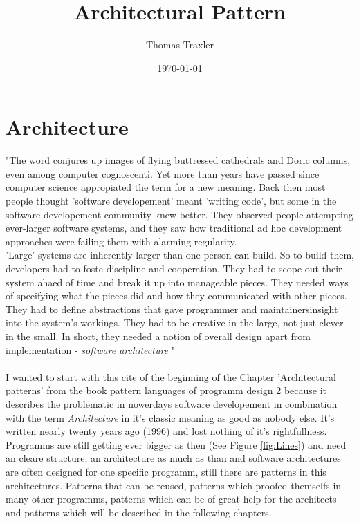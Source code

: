 \documentclass[a4paper,12pt]{scrreprt}
\begin{document}
\author{Thomas Traxler} %
\title{ Architectural Pattern } %
\date{\today} %

\maketitle
\tableofcontents


\chapter{Architecture}
{"}The word conjures up images of flying buttressed cathedrals and Doric columns, even among computer cognoscenti. Yet more than years have passed since computer science appropiated the term for a new meaning. Back then most people thought 'software developement' meant 'writing code', but some in the software developement community knew better. They observed people attempting ever-larger software systems, and they saw how traditional ad hoc development approaches were failing them with alarming regularity. \\ 'Large' systems are inherently larger than one person can build. So to build them, developers had to foste discipline and cooperation. They had to scope out their system ahaed of time and break it up into manageable pieces. They needed ways of specifying what the pieces did and how they communicated with other pieces. They had to define abstractions that gave programmer and maintainersinsight into the system's workings. They had to be creative in the large, not just clever in the small. In short, they needed a notion of overall design apart from implementation - \textit{software architecture} {"}\cite{Lavender1996}\\\\
I wanted to start with this cite of the beginning of the Chapter 'Architectural patterns' from the book pattern languages of programm design 2 because it describes the problematic in nowerdays software developement in combination with the term \textit{Architecture} in it's classic meaning as good as nobody else. It's written nearly twenty years ago (1996) and lost nothing of it's rightfullness. Programms are still getting ever bigger as then (See Figure \ref{fig:Lines}) and need an cleare structure, an architecture as much as than and software architectures are often designed for one specific programm, still there are patterns in this architectures. Patterns that can be reused, patterns which proofed themselfs in many other programms, patterns which can be of great help for the architects and patterns which will be described in the following chapters.
\end{document}
